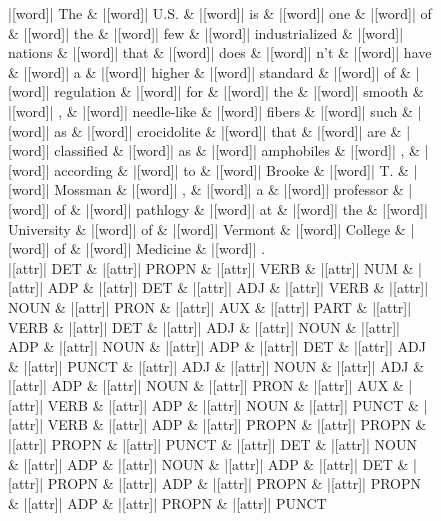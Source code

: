 \documentclass[10pt,a4paper]{article}
\begin{document}
\begin{figure}[h]
{\begin{dependency}[theme = simple]
\begin{deptext}[column sep=1em, row sep=0.1em]
|[word]| The \& |[word]| U.S. \& |[word]| is \& |[word]| one \& |[word]| of \& |[word]| the \& |[word]| few \& |[word]| industrialized \& |[word]| nations \& |[word]| that \& |[word]| does \& |[word]| n't \& |[word]| have \& |[word]| a \& |[word]| higher \& |[word]| standard \& |[word]| of \& |[word]| regulation \& |[word]| for \& |[word]| the \& |[word]| smooth \& |[word]| , \& |[word]| needle-like \& |[word]| fibers \& |[word]| such \& |[word]| as \& |[word]| crocidolite \& |[word]| that \& |[word]| are \& |[word]| classified \& |[word]| as \& |[word]| amphobiles \& |[word]| , \& |[word]| according \& |[word]| to \& |[word]| Brooke \& |[word]| T. \& |[word]| Mossman \& |[word]| , \& |[word]| a \& |[word]| professor \& |[word]| of \& |[word]| pathlogy \& |[word]| at \& |[word]| the \& |[word]| University \& |[word]| of \& |[word]| Vermont \& |[word]| College \& |[word]| of \& |[word]| Medicine \& |[word]| . \\
|[attr]| DET \& |[attr]| PROPN \& |[attr]| VERB \& |[attr]| NUM \& |[attr]| ADP \& |[attr]| DET \& |[attr]| ADJ \& |[attr]| VERB \& |[attr]| NOUN \& |[attr]| PRON \& |[attr]| AUX \& |[attr]| PART \& |[attr]| VERB \& |[attr]| DET \& |[attr]| ADJ \& |[attr]| NOUN \& |[attr]| ADP \& |[attr]| NOUN \& |[attr]| ADP \& |[attr]| DET \& |[attr]| ADJ \& |[attr]| PUNCT \& |[attr]| ADJ \& |[attr]| NOUN \& |[attr]| ADJ \& |[attr]| ADP \& |[attr]| NOUN \& |[attr]| PRON \& |[attr]| AUX \& |[attr]| VERB \& |[attr]| ADP \& |[attr]| NOUN \& |[attr]| PUNCT \& |[attr]| VERB \& |[attr]| ADP \& |[attr]| PROPN \& |[attr]| PROPN \& |[attr]| PROPN \& |[attr]| PUNCT \& |[attr]| DET \& |[attr]| NOUN \& |[attr]| ADP \& |[attr]| NOUN \& |[attr]| ADP \& |[attr]| DET \& |[attr]| PROPN \& |[attr]| ADP \& |[attr]| PROPN \& |[attr]| PROPN \& |[attr]| ADP \& |[attr]| PROPN \& |[attr]| PUNCT \\

\end{deptext}
\end{dependency}}
\end{figure}
\end{document}
